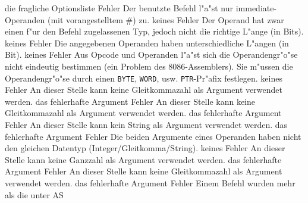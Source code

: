 \documentclass[12pt,a4paper,twoside]{report}
\newcommand{\tty}[1]{{\tt #1}}
\newcommand{\asname}{AS}
\begin{document}
\begin{description}
               {die fragliche Optionsliste}
               {Fehler}
               {Der benutzte Befehl l"a"st nur
                immediate-Operanden (mit vorangestelltem \#) zu.}
               {keines}
               {Fehler}
               {Der Operand hat zwar einen f"ur den Befehl
                zugelassenen Typ, jedoch nicht die richtige L"ange (in
                Bits).}
               {keines}
               {Fehler}
               {Die angegebenen Operanden haben unterschiedliche
                L"angen (in Bit).}
               {keines}
               {Fehler}
               {Aus Opcode und Operanden l"a"st sich die
                Operandengr"o"se nicht eindeutig bestimmen (ein Problem
                des 8086-Assemblers).  Sie m"ussen die Operandengr"o"se
                durch einen \tty{BYTE}, \tty{WORD}, usw. \tty{PTR}-Pr"afix
	        festlegen.}
               {keines}
               {Fehler}
               {An dieser Stelle kann keine Gleitkommazahl als Argument
                verwendet werden.}
               {das fehlerhafte Argument}
               {Fehler}
               {An dieser Stelle kann keine Gleitkommazahl als Argument
                verwendet werden.}
               {das fehlerhafte Argument}
               {Fehler}
               {An dieser Stelle kann kein String als Argument
                verwendet werden.}
               {das fehlerhafte Argument}
               {Fehler}
               {Die beiden Argumente eines Operanden haben nicht
                den gleichen Datentyp (Integer/Gleitkomma/String).}
               {keines}
               {Fehler}
               {An dieser Stelle kann keine Ganzzahl als Argument
                verwendet werden.}
               {das fehlerhafte Argument}
               {Fehler}
               {An dieser Stelle kann keine Gleitkommazahl als Argument
                verwendet werden.}
               {das fehlerhafte Argument}
               {Fehler}
               {Einem Befehl wurden mehr als die unter \asname{}
}
\end{description}
\end{document}

